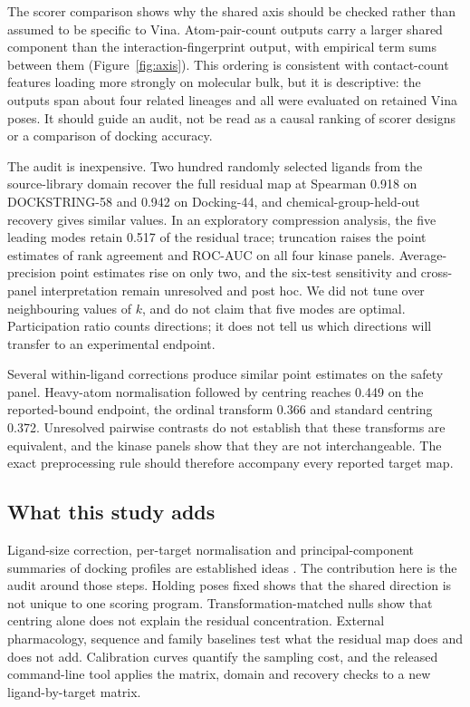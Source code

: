 The scorer comparison shows why the shared axis should be checked rather than assumed to be specific
to Vina. Atom-pair-count outputs carry a larger shared component than the interaction-fingerprint
output, with empirical term sums between them (Figure~\ref{fig:axis}). This ordering is consistent with contact-count
features loading more strongly on molecular bulk, but it is descriptive: the outputs span about
four related lineages and all were evaluated on retained Vina poses. It should guide an audit, not
be read as a causal ranking of scorer designs or a comparison of docking accuracy.

The audit is inexpensive. Two hundred randomly selected ligands from the source-library domain
recover the full residual map at Spearman 0.918 on DOCKSTRING-58 and 0.942 on Docking-44, and
chemical-group-held-out recovery gives similar values. In an exploratory compression analysis,
the five leading modes retain 0.517 of the residual trace; truncation raises the point estimates of
rank agreement and ROC-AUC on all four kinase panels. Average-precision point estimates rise on only two, and
the six-test sensitivity and cross-panel interpretation remain unresolved and post hoc. We did not
tune over neighbouring values of $k$, and do not claim that five modes are optimal. Participation
ratio counts directions; it does not tell us which directions will transfer to an experimental
endpoint.

Several within-ligand corrections produce similar point estimates on the safety panel. Heavy-atom
normalisation followed by centring reaches 0.449 on the reported-bound endpoint, the ordinal
transform 0.366 and standard centring 0.372. Unresolved pairwise contrasts do not establish that
these transforms are equivalent, and the kinase panels show that they are not interchangeable.
The exact preprocessing rule should therefore accompany every reported target map.

\subsection{What this study adds}

Ligand-size correction, per-target normalisation and principal-component summaries of docking
profiles are established ideas \cite{pan2003,vigers2004,carta2007,sepresa2009,casey2009,
luo2017,fukunishi2005,fukunishi2006,fukunishi2018}. The contribution here is the audit around those
steps. Holding poses fixed shows that the shared direction is not unique to one scoring program.
Transformation-matched nulls show that centring alone does not explain the residual concentration. External
pharmacology, sequence and family baselines test what the residual map does and does not add.
Calibration curves quantify the sampling cost, and the released command-line tool applies the matrix,
domain and recovery checks to a new ligand-by-target matrix.

